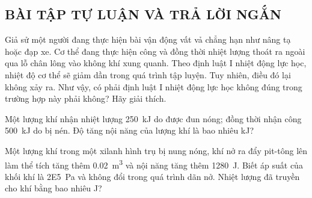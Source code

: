 \subsection{BÀI TẬP TỰ LUẬN VÀ TRẢ LỜI NGẮN}
\setcounter{ex}{0}
\begin{ex}
	Giả sử một người đang thực hiện bài vận động vất vả chẳng hạn như nâng tạ hoặc đạp xe. Cơ thể đang thực hiện công và đồng thời nhiệt lượng thoát ra ngoài qua lỗ chân lông vào không khí xung quanh. Theo định luật I nhiệt động lực học, nhiệt độ cơ thể sẽ giảm dần trong quá trình tập luyện. Tuy nhiên, điều đó lại không xảy ra. Như vậy, có phải định luật I nhiệt động lực học không đúng trong trường hợp này phải không? Hãy giải thích.
\end{ex}
\begin{ex}
	Một lượng khí nhận nhiệt lượng \SI{250}{\kilo\joule} do được đun nóng; đồng thời nhận công \SI{500}{\kilo\joule} do bị nén. Độ tăng nội năng của lượng khí là bao nhiêu \si{\kilo\joule}?
\end{ex}
\begin{ex}
	Một lượng khí trong một xilanh hình trụ bị nung nóng, khí nở ra đẩy pit-tông lên làm thể tích tăng thêm \SI{0.02}{\meter^3} và nội năng tăng thêm \SI{1280}{\joule}. Biết áp suất của khối khí là \SI{2E5}{\pascal} và không đổi trong quá trình dãn nở. Nhiệt lượng đã truyền cho khí bằng bao nhiêu \si{\joule}?
\end{ex}


